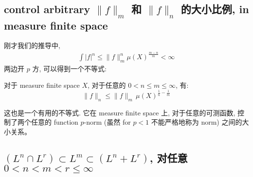 \documentclass[lang=cn,11pt]{elegantbook}
\begin{document}
\subsection{control arbitrary $\|f \|_m $ 和 $\|f \|_n$ 的大小比例, in measure finite space}
\begin{remark}
刚才我们的推导中, \begin{align*}
      \int |f|^n \leq  \|f\|_m^n \mu(X)^{\frac{m-n}{m}} < \infty 
 \end{align*}
 两边开 $p$ 方, 可以得到一个不等式:  
 \begin{theorem}
     对于 measure finite space $X$, 对于任意的 $0< n\leq m \leq \infty$, 有: \[
     \|f\|_n \leq  \|  f \|_m \,\mu(X)^{\frac{1}{n} - \frac{1}{m}}
     \]\end{theorem}
 这也是一个有用的不等式. 它在 measure finite space 上, 对于任意的可测函数, 控制了两个任意的 function $p$-norm (虽然 for $p<1$ 不能严格地称为 norm) 之间的大小关系。
\end{remark}


\subsection{$(L^n\cap L^r) \subset L^m \subset (L^n + L^r)$, 对任意 $0< n < m < r \leq \infty$} 
\end{document}
